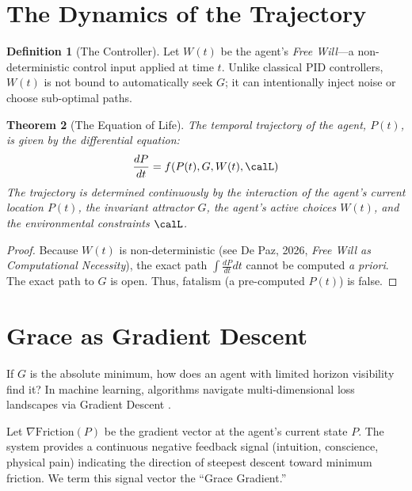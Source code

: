 \documentclass[12pt, a4paper]{article}
\theoremstyle{plain}
\newtheorem{theorem}{Theorem}[section]
\theoremstyle{definition}
\newtheorem{definition}[theorem]{Definition}
\begin{document}
\section{The Dynamics of the Trajectory}\label{sec:trajectory}

\begin{definition}[The Controller]
Let $W(t)$ be the agent's \emph{Free Will}---a non-deterministic control input applied at time $t$. Unlike classical PID controllers, $W(t)$ is not bound to automatically seek $G$; it can intentionally inject noise or choose sub-optimal paths.
\end{definition}

\begin{theorem}[The Equation of Life]
The temporal trajectory of the agent, $P(t)$, is given by the differential equation:
\begin{equation}
    \frac{dP}{dt} = f(P(t), G, W(t), \calL)
\end{equation}
The trajectory is determined continuously by the interaction of the agent's current location $P(t)$, the invariant attractor $G$, the agent's active choices $W(t)$, and the environmental constraints $\calL$.
\end{theorem}

\begin{proof}
Because $W(t)$ is non-deterministic (see De Paz, 2026, \textit{Free Will as Computational Necessity}), the exact path $\int \frac{dP}{dt} dt$ cannot be computed \textit{a priori}. The exact path to $G$ is open. Thus, fatalism (a pre-computed $P(t)$) is false.
\end{proof}

\section{Grace as Gradient Descent}\label{sec:grace}

If $G$ is the absolute minimum, how does an agent with limited horizon visibility find it? In machine learning, algorithms navigate multi-dimensional loss landscapes via Gradient Descent \citep{Cauchy1847}. 

\begin{proposition}
Let $\nabla \text{Friction}(P)$ be the gradient vector at the agent's current state $P$. The system provides a continuous negative feedback signal (intuition, conscience, physical pain) indicating the direction of steepest descent toward minimum friction. We term this signal vector the ``Grace Gradient.''
\end{proposition}
\end{document}
